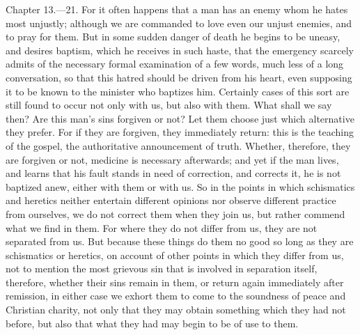 
Chapter 13.—21. For it often happens that a man has an enemy whom he hates most unjustly; although we are commanded to love even our unjust enemies, and to pray for them. But in some sudden danger of death he begins to be uneasy, and desires baptism, which he receives in such haste, that the emergency scarcely admits of the necessary formal examination of a few words, much less of a long conversation, so that this hatred should be driven from his heart, even supposing it to be known to the minister who baptizes him. Certainly cases of this sort are still found to occur not only with us, but also with them. What shall we say then? Are this man’s sins forgiven or not? Let them choose just which alternative they prefer. For if they are forgiven, they immediately return: this is the teaching of the gospel, the authoritative announcement of truth. Whether, therefore, they are forgiven or not, medicine is necessary afterwards; and yet if the man lives, and learns that his fault stands in need of correction, and corrects it, he is not baptized anew, either with them or with us. So in the points in which schismatics and heretics neither entertain different opinions nor observe different practice from ourselves, we do not correct them when they join us, but rather commend what we find in them. For where they do not differ from us, they are not separated from us. But because these things do them no good so long as they are schismatics or heretics, on account of other points in which they differ from us, not to mention the most grievous sin that is involved in separation itself, therefore, whether their sins remain in them, or return again immediately after remission, in either case we exhort them to come to the soundness of peace and Christian charity, not only that they may obtain something which they had not before, but also that what they had may begin to be of use to them.


